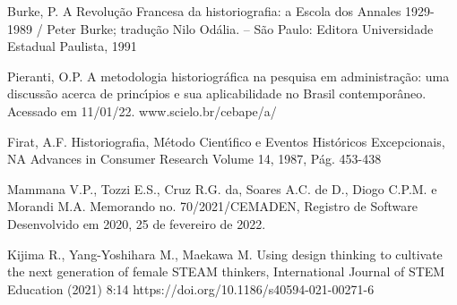 \documentclass[
12pt,		%
openright,	%
twoside,  %
a4paper,			%
chapter=TITLE,		%
english,			%
french,				%
spanish,			%
brazil				%
]{USPSC-classe/USPSC}
\begin{document}
\begin{flushleft}
\begin{flushleft}
[Burke, 1991] Burke, P. A Revolu\c{c}\~ao Francesa da historiografia: a Escola dos Annales 1929-1989 / Peter Burke; tradu\c{c}\~ao Nilo Od\'alia. – S\~ao Paulo: Editora Universidade Estadual Paulista, 1991
\end{flushleft}


\end{flushleft}


\begin{flushleft}
\begin{flushleft}
[PIERANTI, 2022] Pieranti, O.P. A metodologia historiogr\'afica na pesquisa em administra\c{c}\~ao: uma discuss\~ao acerca de princ\'{\i}pios e sua aplicabilidade no Brasil contempor\^aneo. Acessado em 11/01/22. www.scielo.br/cebape/a/
\end{flushleft}


\end{flushleft}


\begin{flushleft}
\begin{flushleft}
[Firat, 1987] Firat, A.F. Historiografia, M\'etodo Cient\'{\i}fico e Eventos Hist\'oricos Excepcionais, NA Advances in Consumer Research Volume 14, 1987, P\'ag. 453-438
\end{flushleft}


\end{flushleft}


\begin{flushleft}
\begin{flushleft}
[MAMMANA et al., 2022] Mammana V.P., Tozzi E.S., Cruz R.G. da, Soares A.C. de D., Diogo C.P.M. e Morandi M.A. Memorando no. 70/2021/CEMADEN, Registro de Software Desenvolvido em 2020, 25 de fevereiro de 2022.
\end{flushleft}


\end{flushleft}


\begin{flushleft}
\begin{flushleft}
[Kijima et al., 2021] Kijima R., Yang-Yoshihara M., Maekawa M. Using design thinking to cultivate the next generation of female STEAM thinkers, International Journal of STEM Education (2021) 8:14 https://doi.org/10.1186/s40594-021-00271-6
\end{flushleft}


\end{flushleft}
\end{document}
